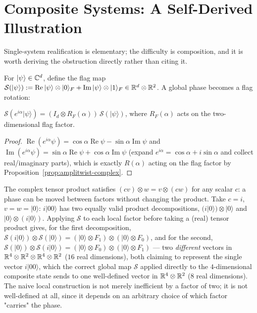 \section{Composite Systems: A Self-Derived Illustration}

Single-system realification is elementary; the difficulty is composition,
and it is worth deriving the obstruction directly rather than citing it.

For $|\psi\rangle\in\mathbb{C}^d$, define the flag map $\mathcal S(|\psi\rangle) :=
\operatorname{Re}|\psi\rangle\otimes|0\rangle_F +
\operatorname{Im}|\psi\rangle\otimes|1\rangle_F \in \mathbb{R}^d\otimes\mathbb{R}^2$. A
global phase becomes a flag rotation:
\begin{proposition}
\label{prop:phase-to-rotation}
$\mathcal S(e^{i\alpha}|\psi\rangle) = (I_d\otimes R_F(\alpha))\,\mathcal
S(|\psi\rangle)$, where $R_F(\alpha)$ acts on the two-dimensional flag
factor.
\end{proposition}

\begin{proof}
$\operatorname{Re}(e^{i\alpha}\psi) = \cos\alpha\operatorname{Re}\psi -
\sin\alpha\operatorname{Im}\psi$ and $\operatorname{Im}(e^{i\alpha}\psi) =
\sin\alpha\operatorname{Re}\psi+\cos\alpha\operatorname{Im}\psi$ (expand
$e^{i\alpha}=\cos\alpha+i\sin\alpha$ and collect real/imaginary parts), which
is exactly $R(\alpha)$ acting on the flag factor by
Proposition~\ref{prop:amplitwist-complex}.
\end{proof}

\begin{example}
\label{ex:phase-kickback}
The complex tensor product satisfies $(cv)\otimes w = v\otimes(cw)$ for any
scalar $c$: a phase can be moved between factors without changing the
product. Take $c=i$, $v=w=|0\rangle$: $i|00\rangle$ has two equally valid
product decompositions, $(i|0\rangle)\otimes|0\rangle$ and
$|0\rangle\otimes(i|0\rangle)$. Applying $\mathcal S$ to each local factor
before taking a (real) tensor product gives, for the first decomposition,
$\mathcal S(i|0\rangle)\otimes\mathcal S(|0\rangle) = (|0\rangle\otimes
F_1)\otimes(|0\rangle\otimes F_0)$, and for the second, $\mathcal
S(|0\rangle)\otimes\mathcal S(i|0\rangle) = (|0\rangle\otimes
F_0)\otimes(|0\rangle\otimes F_1)$ — two \emph{different} vectors in
$\mathbb{R}^4\otimes\mathbb{R}^2\otimes\mathbb{R}^4\otimes\mathbb{R}^2$ ($16$ real dimensions), both
claiming to represent the single vector $i|00\rangle$, which the correct
global map $\mathcal S$ applied directly to the $4$-dimensional composite
state sends to one well-defined vector in $\mathbb{R}^4\otimes\mathbb{R}^2$ ($8$ real
dimensions). The naive local construction is not merely inefficient by a
factor of two; it is not well-defined at all, since it depends on an
arbitrary choice of which factor "carries" the phase.
\end{example}

